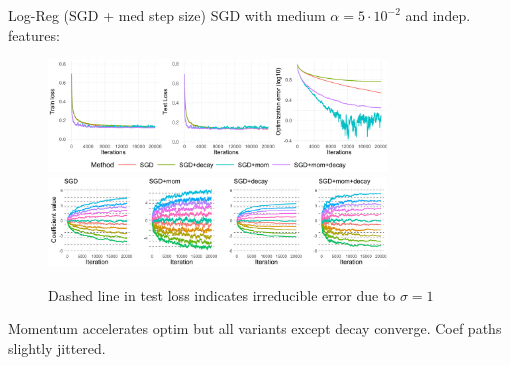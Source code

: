 \documentclass[11pt,compress,t,notes=noshow, xcolor=table]{beamer}
\begin{document}
\begin{vbframe}{Log-Reg (SGD + med step size)}
\vspace{-0.4cm}
SGD with medium $\alpha=5\cdot10^{-2}$ and indep. features:
\begin{figure}
            \includegraphics[width=0.8\textwidth]{slides/04-multivariate-first-order/figure_man/simu_linmod/SGD_log_med_lr_iters.pdf} \\
             \includegraphics[width=0.8\textwidth]{slides/04-multivariate-first-order/figure_man/simu_linmod/SGD_log_coef_med.pdf}\\
            \begin{footnotesize}
                Dashed line in test loss indicates irreducible error due to $\sigma=1$
            \end{footnotesize}
\end{figure}
Momentum accelerates optim but all variants except decay converge. Coef paths slightly jittered.
\end{vbframe}
\end{document}
